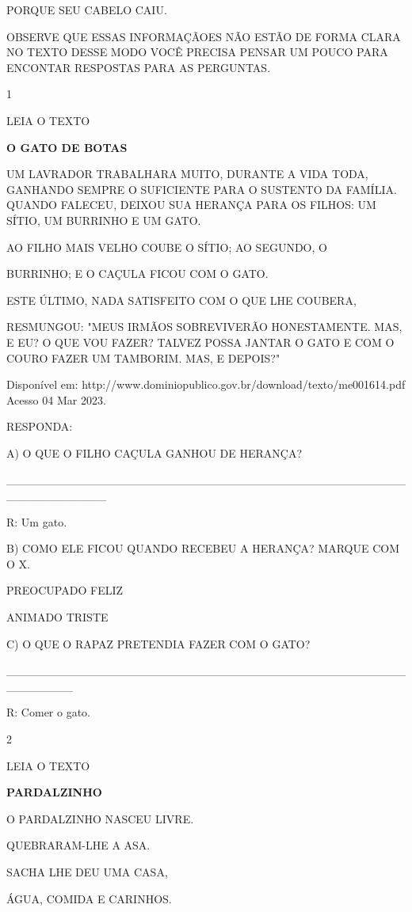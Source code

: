 {{PORQUE SEU CABELO CAIU.

OBSERVE QUE ESSAS INFORMAÇÃOES NÃO ESTÃO DE FORMA CLARA NO TEXTO DESSE
MODO VOCÊ PRECISA PENSAR UM POUCO PARA ENCONTAR RESPOSTAS PARA AS
PERGUNTAS.


\num{1}

LEIA O TEXTO

\textbf{O GATO DE BOTAS}

UM LAVRADOR TRABALHARA MUITO, DURANTE A VIDA TODA, GANHANDO SEMPRE O
SUFICIENTE PARA O SUSTENTO DA FAMÍLIA. QUANDO FALECEU, DEIXOU SUA
HERANÇA PARA OS FILHOS: UM SÍTIO, UM BURRINHO E UM GATO.

AO FILHO MAIS VELHO COUBE O SÍTIO; AO SEGUNDO, O

BURRINHO; E O CAÇULA FICOU COM O GATO.

ESTE ÚLTIMO, NADA SATISFEITO COM O QUE LHE COUBERA,

RESMUNGOU: "MEUS IRMÃOS SOBREVIVERÃO HONESTAMENTE. MAS, E EU? O QUE VOU
FAZER? TALVEZ POSSA JANTAR O GATO E COM O COURO FAZER UM TAMBORIM. MAS,
E DEPOIS?"

Disponível em:
http://www.dominiopublico.gov.br/download/texto/me001614.pdf Acesso 04
Mar 2023.

RESPONDA:

A) O QUE O FILHO CAÇULA GANHOU DE HERANÇA?

\_\_\_\_\_\_\_\_\_\_\_\_\_\_\_\_\_\_\_\_\_\_\_\_\_\_\_\_\_\_\_\_\_\_\_\_\_\_\_\_\_\_\_\_\_\_\_\_\_\_\_\_\_\_\_\_\_\_\_\_

R: Um gato.

B) COMO ELE FICOU QUANDO RECEBEU A HERANÇA? MARQUE COM O X.

PREOCUPADO FELIZ

ANIMADO TRISTE

C) O QUE O RAPAZ PRETENDIA FAZER COM O GATO?

\_\_\_\_\_\_\_\_\_\_\_\_\_\_\_\_\_\_\_\_\_\_\_\_\_\_\_\_\_\_\_\_\_\_\_\_\_\_\_\_\_\_\_\_\_\_\_\_\_\_\_\_\_\_\_\_

R: Comer o gato.

\num{2}

LEIA O TEXTO

\textbf{PARDALZINHO}

O PARDALZINHO NASCEU LIVRE.

\protect\hypertarget{_Hlk128840862}{}{}QUEBRARAM-LHE A ASA.

SACHA LHE DEU UMA CASA,

ÁGUA, COMIDA E CARINHOS.

}}
